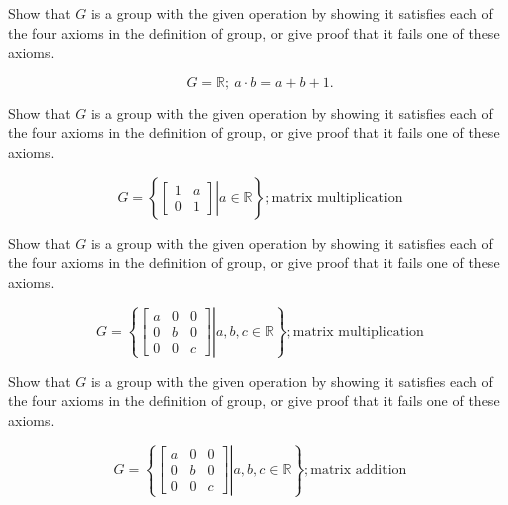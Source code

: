 
\newcommand{\R}{\mathbb{R}}


Show that $G$ is a group with the given operation by showing it satisfies each of the four axioms in the definition of group, or give proof that it fails one of these axioms.
	
	\[G = \R;\ a\cdot b=a+b+1.\]
	

Show that $G$ is a group with the given operation by showing it satisfies each of the four axioms in the definition of group, or give proof that it fails one of these axioms.
	
	\[G=\left\{\left.\begin{bmatrix}1&a\\0&1\end{bmatrix}\right| a\in\R\right\}; \text{matrix multiplication}\]
	

Show that $G$ is a group with the given operation by showing it satisfies each of the four axioms in the definition of group, or give proof that it fails one of these axioms.
	
\[G=\left\{\left.\begin{bmatrix}a&0&0\\0&b&0\\0&0&c\end{bmatrix}\right| a,b,c\in\R\right\}; \text{matrix multiplication}\]
	

Show that $G$ is a group with the given operation by showing it satisfies each of the four axioms in the definition of group, or give proof that it fails one of these axioms.

\[G=\left\{\left.\begin{bmatrix}a&0&0\\0&b&0\\0&0&c\end{bmatrix}\right| a,b,c\in\R\right\}; \text{matrix addition}\]